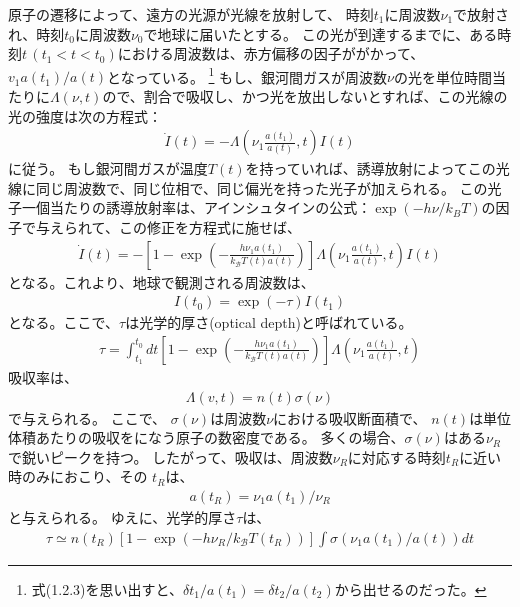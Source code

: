 \documentclass[11pt]{ltjsarticle}
\theoremstyle{plain}
\theoremstyle{break}
\begin{document}
原子の遷移によって、遠方の光源が光線を放射して、
時刻$t_1$に周波数$\nu_1$で放射され、時刻$t_0$に周波数$\nu_0$で地球に届いたとする。
この光が到達するまでに、ある時刻$t \, (t_1 <t< t_0)$における周波数は、赤方偏移の因子ががかって、$v_{1} a\left(t_{1}\right) / a(t)$となっている。
\footnote{式(1.2.3)を思い出すと、$\delta t_1 /a(t_1) = \delta t_2 /a(t_2)$から出せるのだった。}
もし、銀河間ガスが周波数$\nu$の光を単位時間当たりに$\Lambda(\nu,t)$ので、割合で吸収し、かつ光を放出しないとすれば、この光線の光の強度は次の方程式：
\begin{align}
 \dot{I}(t)=-\Lambda\left( \nu_{1}  \frac{a \left(t_{1}\right) }{ a(t)}, t\right) I(t)
\end{align}%
に従う。
もし銀河間ガスが温度$T(t)$を持っていれば、誘導放射によってこの光線に同じ周波数で、同じ位相で、同じ偏光を持った光子が加えられる。
この光子一個当たりの誘導放射率は、アインシュタインの公式：$\exp(-h \nu/k_B T)$の因子で与えられて、この修正を方程式に施せば、
\begin{align}
  \dot{I}(t)
  =-\left[1-\exp \left(-\frac{h \nu_{1} a\left(t_{1}\right)}{k_{\mathcal{B}} T(t) a(t)}\right)\right] \Lambda\left( \nu_{1}  \frac{a \left(t_{1}\right) }{ a(t)}, t\right)  I(t)
\end{align}%
となる。これより、地球で観測される周波数は、
\begin{align}
  I\left(t_{0}\right)=\exp (-\tau) I\left(t_{1}\right)
\end{align}%
となる。ここで、$\tau$は光学的厚さ(optical depth)と呼ばれている。
\begin{align}
 \tau = \int_{t_1}^{t_0} dt  \left[1-\exp \left(-\frac{h \nu_{1} a\left(t_{1}\right)}{k_{\mathcal{B}} T(t) a(t)}\right)\right] \Lambda\left( \nu_{1}  \frac{a \left(t_{1}\right) }{ a(t)}, t\right) 
\end{align}%
吸収率は、
\begin{align}
  \Lambda(v, t)=n(t) \sigma(\nu)
\end{align}%
で与えられる。
ここで、
$\sigma(\nu)$は周波数$\nu$における吸収断面積で、
$n(t)$は単位体積あたりの吸収をになう原子の数密度である。
多くの場合、$\sigma(\nu)$はある$\nu_{R}$で鋭いピークを持つ。
したがって、吸収は、周波数$\nu_{R}$に対応する時刻$t_R$に近い時のみにおこり、その
$t_R$は、
\begin{align}
  a\left(t_{R}\right)=\nu_{1} a\left(t_{1}\right) / \nu_{R}
\end{align}%
と与えられる。
ゆえに、光学的厚さ$\tau$は、
\begin{align}
  \tau \simeq n\left(t_{R}\right)\left[1-\exp \left(-h \nu_{R} / k_{\mathcal{B}} T\left(t_{R}\right)\right)\right] \int \sigma\left(\nu_{1} a\left(t_{1}\right) / a(t)\right) d t
\end{align}%
\end{document}

